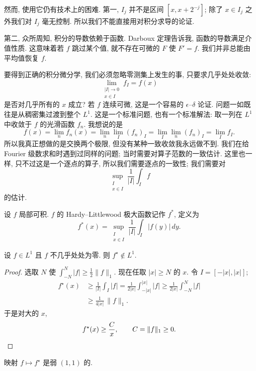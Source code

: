 然而, 使用它仍有技术上的困难. 第一, $I_j$ 并不是区间 $[x,x+2^{-j}]$; 除了 $x\in I_j$ 之外我们对 $I_j$ 毫无控制. 所以我们不能直接用对积分求导的论证.

第二, 众所周知, 积分的导数依赖于函数. Darboux 定理告诉我, 函数的导数满足介值性质. 这意味着若 $f$ 跳过某个值, 就不存在可微的 $F$ 使 $F'=f$. 我们并非总能由平均值恢复 $f$.

要得到正确的积分微分学, 我们必须忽略零测集上发生的事, 只要求几乎处处收敛:
\[
\lim_{\substack{|I|\to0\\ x\in I}}f_{I}=f(x)
\]
是否对几乎所有的 $x$ 成立? 若 $f$ 连续可微, 这是一个容易的 $\epsilon$--$\delta$ 论证. 问题一如既往是从稠密集过渡到整个 $L^{1}$. 这是一个标准问题, 也有一个标准解法: 取一列在 $L^{1}$ 中收敛于 $f$ 的光滑函数 $f_n$. 我想说的是
\[
f(x)=\lim_{n}f_{n}(x)=\lim_{n}\lim_{I}(f_{n})_{I}=\lim_{I}\lim_{n}(f_{n})_{I}=\lim_{I}f_{I}.
\]
所以我真正想做的是交换两个极限, 但没有某种一致收敛我永远做不到. 我们在给 Fourier 级数求和时遇到过同样的问题; 当时需要对算子范数的一致估计. 这里也一样, 只不过这是一个逐点的算子, 所以我们需要逐点的一致性; 我们需要对
\[
\sup_{\substack{I\\ x\in I}}\frac{1}{|I|}\int_{I}f
\]
的估计.

\begin{definition}\label{def:2.22}
设 $f$ 局部可积. $f$ 的 Hardy--Littlewood 极大函数记作 $f^{\ast}$, 定义为
\[
f^{\ast}(x)=\sup_{\substack{I\\ x\in I}}\frac{1}{|I|}\int_{I}|f(y)|\,dy.
\]
\end{definition}

\begin{lemma}\label{lem:2.23}
设 $f\in L^1$ 且 $f$ 不几乎处处为零. 则 $f^{\star}\notin L^1$.
\end{lemma}

\begin{proof}
选取 $N$ 使 $\int_{-N}^{N}|f|\geq\frac{1}{2}\|f\|_1$. 现在任取 $|x|\geq N$ 的 $x$. 令 $I=[-|x|,|x|]$;
\begin{align*}
f^{\star}(x)&\geq\frac{1}{|I|}\int_{I}|f|
=\frac{1}{2|x|}\int_{-|x|}^{|x|}|f|\geq\frac{1}{2|x|}\int_{-N}^{N}|f| \\
&\geq\frac{1}{4|x|}\,\|f\|_{1}.
\end{align*}
于是对大的 $x$,
\[
f^{\star}(x)\geq\frac{C}{x},\qquad C=\|f\|_{1}\geq 0. \qedhere
\]
\end{proof}

\begin{theorem}\label{thm:2.24}
映射 $f\mapsto f^{\star}$ 是弱 $(1,1)$ 的.
\end{theorem}


